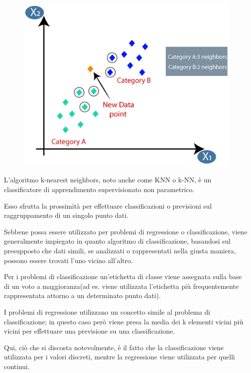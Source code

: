 \begin{figure}
    \begin{center}    
        \includegraphics[width=0.9\linewidth]{images/image11.jpeg}
    \end{center}
\end{figure}

L'algoritmo k-nearest neighbors, noto anche come KNN o k-NN, è un classificatore di apprendimento supervisionato non parametrico.

Esso sfrutta la prossimità per effettuare classificazioni o previsioni sul raggruppamento di un singolo punto dati. 

Sebbene possa essere utilizzato per problemi di regressione o classificazione, viene generalmente impiegato in quanto algoritmo di classificazione, basandosi sul presupposto che dati simili, se analizzati o rappresentati nella giusta maniera, possono essere trovati l'uno vicino all'altro.

Per i problemi di classificazione un'etichetta di classe viene assegnata sulla base di un voto a maggioranza(ad es. viene utilizzata l'etichetta più frequentemente rappresentata attorno a un determinato punto dati).

I problemi di regressione utilizzano un concetto simile al problema di classificazione; in questo caso però viene presa la media dei k elementi vicini più vicini per effettuare una previsione su una classificazione. 

Qui, ciò che si discosta notevolmente, è il fatto che la classificazione viene utilizzata per i valori discreti, mentre la regressione viene utilizzata per quelli continui. 

